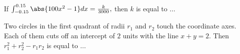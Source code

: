 	  \hfill{}  \\
    \item If $\int_{-0.15}^{0.15}\abs{100x^2-1}dx=\frac{k}{3000},$ then $k$ is equal to $\dots$
	   \hfill{} \\
    \item Two circles in the first quadrant of radii $r_1$ and $r_2$ touch the coordinate axes. Each of them cuts off an intercept of $2$ units with the line $x+y=2.$ Then $r_1^2+r_2^2-r_1r_2$ is equal to $\dots$
	    \hfill{} \\

